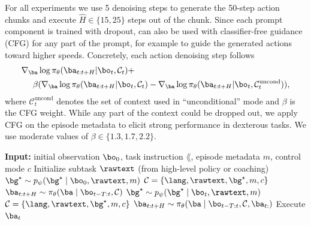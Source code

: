 For all experiments we use 5 denoising steps to generate the 50-step action chunks and execute $\hat H \in \{15, 25\}$ steps out of the chunk. Since each prompt component is trained with dropout, \MethodName{} can also be used with classifier-free guidance (CFG) \cite{ho2022cfg} for any part of the prompt, for example to guide the generated actions toward higher speeds. Concretely, each action denoising step follows
\begin{equation*}
\begin{aligned}
    \nabla_\ba &\log \pi_\theta(\ba_{t:t+H} \vert \bo_t, \mathcal{C}_t) + \\ 
    \beta &( \nabla_\ba \log \pi_\theta(\ba_{t:t+H} \vert \bo_t, \mathcal{C}_t) - \nabla_\ba \log \pi_\theta(\ba_{t:t+H} \vert \bo_t, \mathcal{C}_t^\text{uncond})),
\end{aligned}
\end{equation*}
where $\mathcal{C}_t^\text{uncond}$ denotes the set of context used in ``unconditional'' mode and $\beta$ is the CFG weight. While any part of the context could be dropped out, we apply CFG on the episode metadata to elicit strong performance in dexterous tasks. We use moderate values of $\beta \in \{1.3, 1.7, 2.2\}$.

\begin{algorithm}[t]
\caption{Prompting \MethodName{} at test time}
\label{alg:testtime}
\begin{algorithmic}[1]
\State \textbf{Input:} initial observation $\bo_0$, task instruction $\lang$, episode metadata $m$, control mode $c$
\State Initialize subtask $\rawtext$ (from high-level policy or coaching)
\State $\bg^{\star} \sim p_{\psi}(\bg^{\star} \mid \bo_0, \rawtext, m)$
\State $\mathcal{C} = \{\lang, \rawtext, \bg^{\star}, m, c\}$
\State $\ba_{t:t+H} \sim \pi_{\theta}(\ba \mid \bo_{t-T:t}, \mathcal{C})$ 
        \State $\bg^{\star} \sim p_{\psi}(\bg^{\star} \mid \bo_t, \rawtext, m)$ 
        \State $\mathcal{C} = \{\lang, \rawtext, \bg^{\star}, m, c\}$
    \EndIf
        \State $\ba_{t:t+H} \sim \pi_{\theta}(\ba \mid \bo_{t-T:t}, \mathcal{C},\ba_{t:})$ 
    \EndIf
    \State Execute $\ba_t$
\EndFor
\end{algorithmic}
\end{algorithm}

